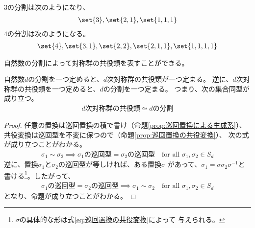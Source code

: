 	\begin{example}[自然数の分割の例]\label{eg:自然数の分割の例} %
		$3$の分割は次のようになり、
		\begin{equation*}\begin{split} %
			\set{3},\set{2,1},\set{1,1,1}
		\end{split}\end{equation*} %
		$4$の分割は次のようになる。
		\begin{equation*}\begin{split} %
			\set{4},\set{3,1},\set{2,2},\set{2,1,1},\set{1,1,1,1}
		\end{split}\end{equation*} %
	\end{example} %

	自然数の分割によって対称群の共役類を表すことができる。

	\begin{proposition}[共役類と巡回型]\label{prop:共役類と巡回型} %
		自然数$d$の分割を一つ定めると、$d$次対称群の共役類が一つ定まる。
		逆に、$d$次対称群の共役類を一つ定めると、$d$の分割を一つ定まる。
		つまり、次の集合同型が成り立つ。
		\begin{equation*}\begin{split} %
			d\text{次対称群の共役類} \simeq d\text{の分割}
		\end{split}\end{equation*} %
	\end{proposition} %
	\begin{proof} %
		任意の置換は巡回置換の積で書け（命題\ref{prop:巡回置換による生成系}）、
		共役変換は巡回型を不変に保つので（命題\ref{prop:巡回置換の共役変換}）、
		次の式が成り立つことがわかる。
		\begin{equation*}\begin{split} %
			\sigma_1\sim \sigma_2 
			\implies \sigma_1\text{の巡回型}=\sigma_2\text{の巡回型}
			\quad\text{for all }\sigma_1,\sigma_2\in S_d
		\end{split}\end{equation*} %
		逆に、置換$\sigma_1$と$\sigma_2$の巡回型が等しければ、ある置換$\sigma$
		があって、$\sigma_1=\sigma\sigma_2\sigma^{-1}$と書ける\footnote{
			$\sigma$の具体的な形は式\eqref{eq:巡回置換の共役変換}によって
			与えられる。
		}。したがって、
		\begin{equation*}\begin{split} %
			\sigma_1\text{の巡回型}=\sigma_2\text{の巡回型}
			\implies \sigma_1\sim \sigma_2 
			\quad\text{for all }\sigma_1,\sigma_2\in S_d
		\end{split}\end{equation*} %
		となり、命題が成り立つことがわかる。
	\end{proof} %

